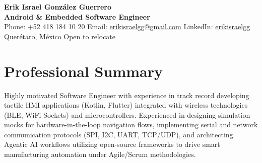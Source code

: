 \documentclass[10pt,a4paper]{article}
\begin{document}
\begin{center}
    {\Huge \textbf{Erik Israel González Guerrero}} \\ \vspace{4pt}
    {\large \textcolor{primary}{\textbf{Android \& Embedded Software Engineer}}} \\ \vspace{6pt}
    Phone: +52 418 184 10 20 \quad
    Email: \href{mailto:erikisraelgg@gmail.com}{erikisraelgg@gmail.com} \quad
    LinkedIn: \href{https://www.linkedin.com/in/erikisraelgg/}{erikisraelgg} \\
    Querétaro, México \quad Open to relocate
\end{center}

\section*{Professional Summary}
Highly motivated Software Engineer with experience in track record developing tactile HMI applications (Kotlin, Flutter) integrated with wireless technologies (BLE, WiFi Sockets) and microcontrollers. Experienced in designing simulation mocks for hardware-in-the-loop navigation flows, implementing serial and network communication protocols (SPI, I2C, UART, TCP/UDP), and architecting Agentic AI workflows utilizing open-source frameworks to drive smart manufacturing automation under Agile/Scrum methodologies.

\end{document}
